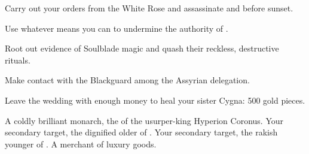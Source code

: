 \documentclass[char]{Kos}
\begin{document}
\begin{itemz}[Goals]
\item Carry out your orders from the White Rose and assassinate \cGroom{} and \cPoet{} before sunset.
\item Use whatever means you can to undermine the authority of \cEtruriaKing{\Monarch} \cEtruriaKing{}.
\item Root out evidence of Soulblade magic and quash their reckless, destructive rituals.
\item Make contact with the Blackguard among the Assyrian delegation.
\item Leave the wedding with enough money to heal your sister Cygna: 500 gold pieces.
\end{itemz}

\begin{contacts}
\contact{\cEtruriaKing{}} A coldly brilliant monarch, the \cEtruriaKing{\offspring} of the usurper-king Hyperion Coronus.
\contact{\cGroom{}} Your secondary target, the dignified older \cGroom{\offspring} of  \cEtruriaKing{\Monarch} \cEtruriaKing{}.
\contact{\cPoet{}} Your secondary target, the rakish younger \cPoet{\offspring} of  \cEtruriaKing{\Monarch} \cEtruriaKing{}.
\contact{\cMerchant{}} A merchant of luxury goods.
\end{contacts}
\end{document}
